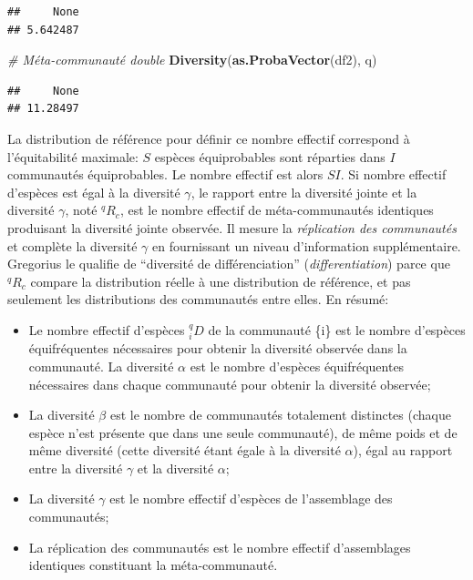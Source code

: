 \documentclass[
  11pt,
  french,
  a4paper,
  extrafontsizes,onecolumn,openright
  ]{memoir}
\newenvironment{Shaded}{\begin{snugshade}}{\end{snugshade}}
\newcommand{\CommentTok}[1]{\textcolor[rgb]{0.56,0.35,0.01}{\textit{#1}}}
\newcommand{\FunctionTok}[1]{\textcolor[rgb]{0.13,0.29,0.53}{\textbf{#1}}}
\newcommand{\NormalTok}[1]{#1}
\providecommand{\tightlist}{%
  \setlength{\itemsep}{0pt}\setlength{\parskip}{0pt}}
\begin{document}
\begin{verbatim}
##     None 
## 5.642487
\end{verbatim}

\begin{Shaded}
\begin{Highlighting}[]
\CommentTok{\# Méta{-}communauté double}
\FunctionTok{Diversity}\NormalTok{(}\FunctionTok{as.ProbaVector}\NormalTok{(df2), q)}
\end{Highlighting}
\end{Shaded}

\begin{verbatim}
##     None 
## 11.28497
\end{verbatim}

\normalsize

La distribution de référence pour définir ce nombre effectif correspond à l'équitabilité maximale: \(S\) espèces équiprobables sont réparties dans \(I\) communautés équiprobables.
Le nombre effectif est alors \(SI\).
Si nombre effectif d'espèces est égal à la diversité \(\gamma\), le rapport entre la diversité jointe et la diversité \(\gamma\), noté \(^{q}\!R_{c}\), est le nombre effectif de méta-communautés identiques produisant la diversité jointe observée.
Il mesure la \emph{réplication des communautés} et complète la diversité \(\gamma\) en fournissant un niveau d'information supplémentaire.
Gregorius le qualifie de ``diversité de différenciation'' (\emph{differentiation}) parce que \(^{q}\!R_{c}\) compare la distribution réelle à une distribution de référence, et pas seulement les distributions des communautés entre elles.
En résumé:

\begin{itemize}
\tightlist
\item
  Le nombre effectif d'espèces \(^{q}_{i}\!D\) de la communauté \{i\} est le nombre d'espèces équifréquentes nécessaires pour obtenir la diversité observée dans la communauté.
  La diversité \(\alpha\) est le nombre d'espèces équifréquentes nécessaires dans chaque communauté pour obtenir la diversité observée;
\item
  La diversité \(\beta\) est le nombre de communautés totalement distinctes (chaque espèce n'est présente que dans une seule communauté), de même poids et de même diversité (cette diversité étant égale à la diversité \(\alpha\)), égal au rapport entre la diversité \(\gamma\) et la diversité \(\alpha\);
\item
  La diversité \(\gamma\) est le nombre effectif d'espèces de l'assemblage des communautés;
\item
  La réplication des communautés est le nombre effectif d'assemblages identiques constituant la méta-communauté.
\end{itemize}
\end{document}
